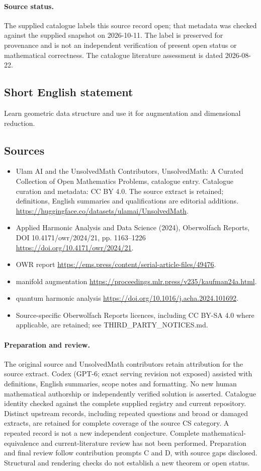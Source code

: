\documentclass[11pt]{article}
\begin{document}
\paragraph{Source status.}
The supplied catalogue labels this source record open; that metadata was checked against the supplied snapshot on 2026-10-11. The label is preserved for provenance and is not an independent verification of present open status or mathematical correctness. The catalogue literature assessment is dated 2026-08-22.
\subsection{Short English statement}
Learn geometric data structure and use it for augmentation and dimensional reduction.
\subsection{Sources}
\begin{itemize}
\item[S1] Ulam AI and the UnsolvedMath Contributors, UnsolvedMath: A Curated Collection of Open Mathematics Problems, catalogue entry. Catalogue curation and metadata: CC BY 4.0. The source extract is retained; definitions, English summaries and qualifications are editorial additions.
\url{https://huggingface.co/datasets/ulamai/UnsolvedMath}.
\item[S2] Applied Harmonic Analysis and Data Science (2024), Oberwolfach Reports, DOI 10.4171/owr/2024/21, pp. 1163--1226
\url{https://doi.org/10.4171/owr/2024/21}.
\item[S3] OWR report
\url{https://ems.press/content/serial-article-files/49476}.
\item[S4] manifold augmentation
\url{https://proceedings.mlr.press/v235/kaufman24a.html}.
\item[S5] quantum harmonic analysis
\url{https://doi.org/10.1016/j.acha.2024.101692}.
\item Source-specific Oberwolfach Reports licences, including CC BY-SA 4.0 where applicable, are retained; see THIRD\_PARTY\_NOTICES.md.
\end{itemize}
\paragraph{Preparation and review.}
The original source and UnsolvedMath contributors retain attribution for the source extract. Codex (GPT-6; exact serving revision not exposed) assisted with definitions, English summaries, scope notes and formatting. No new human mathematical authorship or independently verified solution is asserted. Catalogue identity checked against the complete supplied registry and current repository. Distinct upstream records, including repeated questions and broad or damaged extracts, are retained for complete coverage of the source CS category. A repeated record is not a new independent conjecture. Complete mathematical-equivalence and current-literature review has not been performed. Preparation and final review follow contribution prompts C and D, with source gaps disclosed. Structural and rendering checks do not establish a new theorem or open status.
\label{end:statement}
\end{document}
